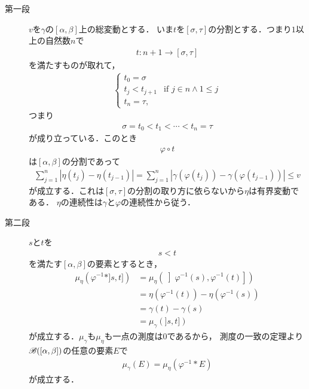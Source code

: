 	\begin{sketch}\mbox{}
		\begin{description}
			\item[第一段]
				$v$を$\gamma$の$[\alpha,\beta]$上の総変動とする．
				いま$t$を$[\sigma,\tau]$の分割とする．つまり$1$以上の自然数$n$で
				\begin{align}
					t: n+1 \longrightarrow [\sigma,\tau]
				\end{align}
				を満たすものが取れて，
				\begin{align}
					\begin{cases}
						t_{0} = \sigma & \\
						t_{j} < t_{j+1} & \mbox{if } j \in n \wedge 1 \leq j \\
						t_{n} = \tau, &
					\end{cases}
				\end{align}
				つまり
				\begin{align}
					\sigma = t_{0} < t_{1} < \cdots < t_{n} = \tau
				\end{align}
				が成り立っている．このとき
				\begin{align}
					\varphi \circ t
				\end{align}
				は$[\alpha,\beta]$の分割であって
				\begin{align}
					\sum_{j=1}^{n} \left|\eta(t_j) - \eta(t_{j-1})\right|
					= \sum_{j=1}^{n} \left|\gamma(\varphi(t_j)) - \gamma(\varphi(t_{j-1}))\right|
					\leq v
				\end{align}
				が成立する．これは$[\sigma,\tau]$の分割の取り方に依らないから$\eta$は有界変動である．
				$\eta$の連続性は$\gamma$と$\varphi$の連続性から従う．
				
			\item[第二段]
				$s$と$t$を
				\begin{align}
					s < t
				\end{align}
				を満たす$[\alpha,\beta]$の要素とするとき，
				\begin{align}
					\mu_{\eta}\left(\varphi^{-1} \ast ]s,t]\right)
					&= \mu_{\eta}\left(\left]\varphi^{-1}(s), \varphi^{-1}(t)\right]\right) \\
					&= \eta(\varphi^{-1}(t)) - \eta(\varphi^{-1}(s)) \\
					&= \gamma(t) - \gamma(s) \\
					&= \mu_{\gamma}(]s,t])
				\end{align}
				が成立する．$\mu_{\gamma}$も$\mu_{\eta}$も一点の測度は$0$であるから，
				測度の一致の定理より$\mathscr{B}([\alpha,\beta])$の任意の要素$E$で
				\begin{align}
					\mu_{\gamma}(E) = \mu_{\eta} \left(\varphi^{-1} \ast E\right)
				\end{align}
				が成立する．
				\QED
		\end{description}
	\end{sketch}
	
